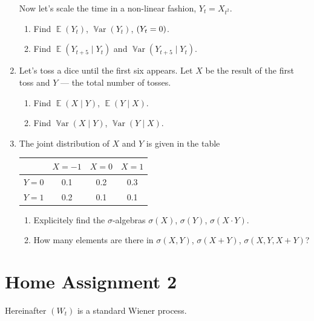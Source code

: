 \documentclass[12pt]{article}
\DeclareMathOperator{\Var}{\mathbb{V}ar}
\let\P\relax
\DeclareMathOperator{\P}{\mathbb{P}}
\DeclareMathOperator{\E}{\mathbb{E}}
\begin{document}
\begin{enumerate}
  Now let's scale the time in a non-linear fashion, $Y_t = X_{t^2}$.

  \begin{enumerate}
    \item Find $\E(Y_t)$, $\Var(Y_t)$, $\P(Y_t = 0)$.
    \item Find $\E(Y_{t+5} \mid Y_t)$ and $\Var(Y_{t+5} \mid Y_t)$.
  \end{enumerate}

  \item Let's toss a dice until the first six appears. 
  Let $X$ be the result of the first toss and $Y$ — the total number of tosses.

  \begin{enumerate}
    \item Find $\E(X \mid Y)$, $\E(Y \mid X)$.
    \item Find $\Var(X \mid Y)$, $\Var(Y \mid X)$.
  \end{enumerate}

  \item The joint distribution of $X$ and $Y$ is given in the table
    
    \begin{tabular}{*{4}{c}}
    \toprule
    & $X=-1$ & $X=0$ & $X=1$ \\
    \midrule
    $Y=0$ & 0.1 & 0.2 & 0.3  \\
    $Y=1$ & 0.2 & 0.1 & 0.1  \\
    \bottomrule
    \end{tabular}
    
    \begin{enumerate}
     \item Explicitely find the $\sigma$-algebras $\sigma(X)$, $\sigma(Y)$, $\sigma(X \cdot Y)$.
     \item How many elements are there in $\sigma(X, Y)$, $\sigma(X + Y)$, $\sigma(X, Y, X+Y)$?
    \end{enumerate}
    
\end{enumerate}


\newpage
\section*{Home Assignment 2}
Hereinafter $(W_t)$ is a standard Wiener process.  
\end{document}
